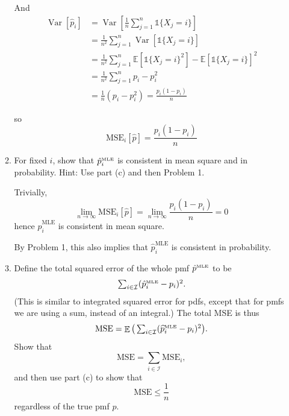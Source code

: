 \documentclass[11pt]{report}
\DeclareMathOperator{\Exp}{\mathbb{E}}
\DeclareMathOperator{\Var}{\text{Var}}
\newcommand{\ind}{{\mathds{1}}}
\newcommand{\E}{\mathbb{E}}
\begin{document}
\begin{enumerate}[1.]
\begin{enumerate}
                    And
                    \begin{align*}
                        \Var[\hat p_i] & = \Var\left[\frac{1}{n} \sum_{j=1}^{n} \ind\{X_j = i\} \right]               \\
                                       & = \frac{1}{n^2} \sum_{j=1}^n \Var[\ind\{X_j = i\}]                           \\
                                       & = \frac{1}{n^2} \sum_{j=1}^{n} \E[\ind\{X_j = i\}^2] - \E[\ind\{X_j = i\}]^2 \\
                                       & = \frac{1}{n^2} \sum_{j=1}^{n} p_i - p_i^2                                   \\
                                       & = \frac{1}{n}(p_i - p_i^2)
                        = \frac{p_i(1 - p_i)}{n}
                    \end{align*}

                    so
                    \[\text{MSE}_i[\hat p] = \frac{p_i(1 - p_i)}{n}\]
                    \color{black}

              \item For fixed $i$, show that $\hat p^{\text{\tiny MLE}}_i$ is consistent in mean square and in probability. Hint: Use part (c) and then Problem 1.

                    \color{blue}
                    Trivially,
                    \[\lim_{n \to \infty} \text{MSE}_i[\hat p] = \lim_{n \to \infty} \frac{p_i(1 - p_i)}{n} = 0\]
                    hence $\hat p_i^{\text{MLE}}$ is consistent in mean square.

                    By Problem 1, this also implies that $\hat p_i^{\text{MLE}}$ is consistent in probability.
                    \color{black}


              \item Define the total squared error of the whole pmf $\hat p^{\text{\tiny MLE}}$ to be
                    \[ \textstyle \sum_{i\in\mathcal{I}} (\hat p^{\text{\tiny MLE}}_i-p_i)^2 . \]
                    (This is similar to integrated squared error for pdfs, except that for pmfs we are using a sum, instead of an integral.) The total MSE is thus
                    \[ \textstyle \text{MSE} = \Exp\big(\sum_{i\in\mathcal{I}} (\widehat p_i^{\text{\tiny MLE}}-p_i)^2\big) .
                    \]
                    Show that
                    \[ \textstyle \text{MSE} = \sum_{i\in\mathcal{I}} \text{MSE}_i  , \]
                    and then use part (c) to show that
                    \[ \text{MSE} \leq \frac{1}{n} \]
                    regardless of the true pmf $p$.


\end{enumerate}
\end{enumerate}
\end{document}
